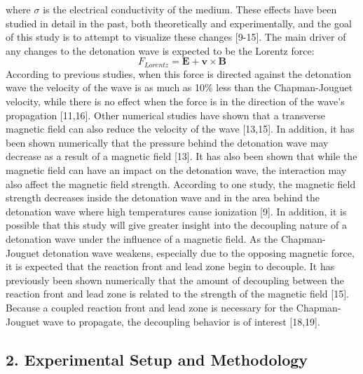 \documentclass[preview,12pt]{article}
\begin{document}
where $\sigma$ is the electrical conductivity of the medium. \newline
\indent These effects have been studied in detail in the past, both theoretically and experimentally, and the goal of this study is to attempt to visualize these changes [9-15].  The main driver of any changes to the detonation wave is expected to be the Lorentz force:
\begin{equation}
    F_{Lorentz}=\textbf{E}+\textbf{v}\times\textbf{B}
\end{equation}
\indent According to previous studies, when this force is directed against the detonation wave the velocity of the wave is as much as 10\% less than the Chapman-Jouguet velocity, while there is no effect when the force is in the direction of the wave's propagation [11,16].  Other numerical studies have shown that a transverse magnetic field can also reduce the velocity of the wave [13,15].  In addition, it has been shown numerically that the pressure behind the detonation wave may decrease as a result of a magnetic field [13].  
\newline
\indent It has also been shown that while the magnetic field can have an impact on the detonation wave, the interaction may also affect the magnetic field strength.  According to one study, the magnetic field strength decreases inside the detonation wave and in the area behind the detonation wave where high temperatures cause ionization [9].  
\newline
\indent In addition, it is possible that this study will give greater insight into the decoupling nature of a detonation wave under the influence of a magnetic field.  As the Chapman-Jouguet detonation wave weakens, especially due to the opposing magnetic force, it is expected that the reaction front and lead zone begin to decouple.  It has previously been shown numerically that the amount of decoupling between the reaction front and lead zone is related to the strength of the magnetic field [15].  Because a coupled reaction front and lead zone is necessary for the Chapman-Jouguet wave to propagate, the decoupling behavior is of interest [18,19].
$$$$
\begin{center}
    \section*{\footnotesize{2. Experimental Setup and Methodology}}
\end{center}
\end{document}
